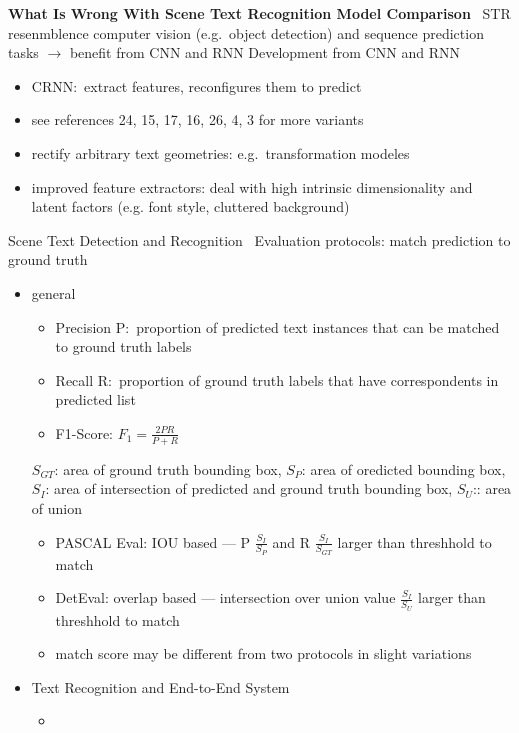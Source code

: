 \textbf{What Is Wrong With Scene Text Recognition Model Comparison}~\cite{baek_what_2019}
\ac{STR} resenmblence computer vision (e.g.\ object detection) and sequence prediction
tasks $\rightarrow$ benefit from \ac{CNN} and \ac{RNN}
Development from \ac{CNN} and \ac{RNN}
\begin{itemize}
    \item CRNN:\ extract features, reconfigures them to predict
    \item see references 24, 15, 17, 16, 26, 4, 3 for more variants
    \item rectify arbitrary text geometries: e.g.\ transformation modeles
    \item improved feature extractors: deal with high intrinsic dimensionality and latent factors
        (e.g. font style, cluttered background)
\end{itemize}

Scene Text Detection and Recognition~\cite{long_scene_2021}
Evaluation protocols: match prediction to ground truth
\begin{itemize}
    \item general
        \begin{itemize}
            \item Precision P:\ proportion of predicted text instances that can be matched to ground
                truth labels
            \item Recall R:\ proportion of ground truth labels that have correspondents in predicted
                list
            \item F1-Score: $F_1=\frac{2PR}{P+R}$
        \end{itemize}
        $S_{GT}$: area of ground truth bounding box, $S_P$: area of oredicted bounding box,
        $S_I$: area of intersection of predicted and ground truth bounding box, $S_U$:: area of union
        \begin{itemize}
            \item PASCAL Eval: IOU based --- P $\frac{S_I}{S_P}$ and R $\frac{S_I}{S_{GT}}$ larger
                than threshhold to match
            \item DetEval: overlap based --- intersection over union value $\frac{S_I}{S_U}$
                larger than threshhold to match
            \item match score may be different from two protocols in slight variations
        \end{itemize}
    \item Text Recognition and End-to-End System
        \begin{itemize}
            \item %
        \end{itemize}
\end{itemize}

